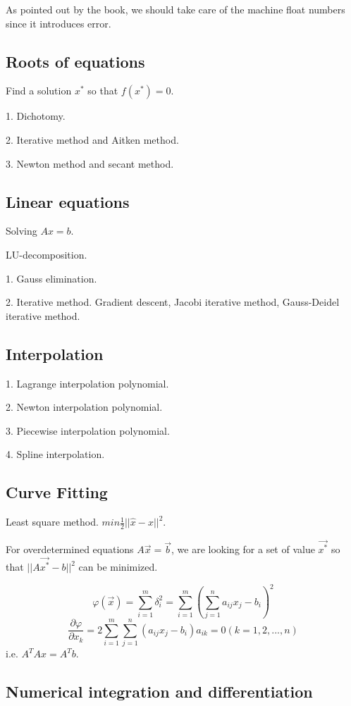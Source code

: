 
As pointed out by the book, we should take care of the
machine float numbers since it introduces error.

\subsection{Roots of equations}

Find a solution $x^*$ so that $f(x^*)=0$.

1. Dichotomy.

2. Iterative method and Aitken method.

3. Newton method and secant method.

\subsection{Linear equations}

Solving $Ax=b$.

LU-decomposition.

1. Gauss elimination.

2. Iterative method. Gradient descent, Jacobi iterative method, Gauss-Deidel iterative method.

\subsection{Interpolation}

1. Lagrange interpolation polynomial.

2. Newton interpolation polynomial.

3. Piecewise interpolation polynomial.

4. Spline interpolation.

\subsection{Curve Fitting}

Least square method. $min \frac{1}{2}|| \hat{x} - x ||^2$.

For overdetermined equations $A\vec{x}=\vec{b}$, we are looking for a set of
value $\vec{x^*}$ so that $|| A\vec{x^*} - b ||^2$ can be minimized.

$$\varphi(\vec{x}) = \sum_{i=1}^m \delta_i^2 = \sum_{i=1}^m 
  (\sum_{j=1}^n a_{ij}x_j - b_i )^2 $$
$$ \frac{\partial \varphi}{\partial x_k} = 
  2\sum_{i=1}^m \sum_{j=1}^n (a_{ij}x_j-b_i)a_{ik} = 0 (k=1,2,...,n) $$
i.e. $A^T A x = A^T b $.

\subsection{Numerical integration and differentiation}

